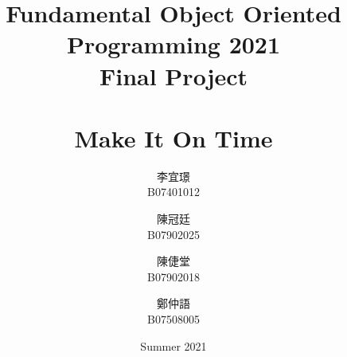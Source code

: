 \title{Fundamental Object Oriented Programming 2021 \\ Final Project \\ \quad \\ \textbf{Make It On Time}} %
\author{
    李宜璟\\B07401012\\
    \and
    陳冠廷\\B07902025\\
    \and
    陳倢堂\\B07902018\\
    \and
    鄭仲語\\B07508005\\
}
\date{Summer 2021}
\begin{titlingpage}
\null  %
\nointerlineskip  %
\vfill
\let\snewpage \newpage
\let\newpage \relax
\maketitle
\thispagestyle{empty}
\let \newpage \snewpage
\vfill 
\break %
\end{titlingpage}

